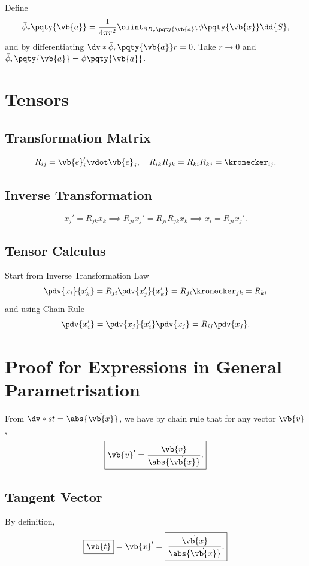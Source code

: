 \documentclass{article}
\begin{document}
Define
\[
    \bar{\phi}_r \pqty{\vb{a}} = \frac{1}{4 \pi r^2} \oiint_{\partial B_r \pqty{\vb{a}}} \phi \pqty{\vb{x}} \dd{S},
\]
and by differentiating \(\dv*{\bar{\phi}_r \pqty{\vb{a}}}{r} = 0\). Take \(r \to 0\) and \(\bar{\phi}_r \pqty{\vb{a}} = \phi \pqty{\vb{a}}\).

\section*{Tensors}

\subsection*{Transformation Matrix}

\[
    R_{ij} = \vb{e}'_i \vdot \vb{e}_j, \quad R_{ik} R_{jk} = R_{ki} R_{kj} = \kronecker_{ij}.
\]

\subsection*{Inverse Transformation}

\[
    x_j' = R_{jk} x_k \implies R_{ji} x_j' = R_{ji} R_{jk} x_k \implies x_i = R_{ji} x_j'.
\]

\subsection*{Tensor Calculus}

Start from Inverse Transformation Law
\[
    \pdv{x_i}{x_k'} = R_{ji} \pdv{x_j'}{x_k'} = R_{ji} \kronecker_{jk} = R_{ki}
\]
and using Chain Rule
\[
    \pdv{x_i'} = \pdv{x_j}{x_i'} \pdv{x_j} = R_{ij} \pdv{x_j}.
\]

\clearpage

\section*{Proof for Expressions in General Parametrisation}

From \(\dv*{s}{t} = \abs{\dot{\vb{x}}}\), we have by chain rule that for any vector \(\vb{v}\),
\[
    \boxed{\vb{v}' = \frac{\dot{\vb{v}}}{\abs{\dot{\vb{x}}}}.}
\]

\subsection*{Tangent Vector}

By definition,
\[
    \boxed{\vb{t}} = \vb{x}' = \boxed{\frac{\dot{\vb{x}}}{\abs{\dot{\vb{x}}}}.}
\]
\end{document}
